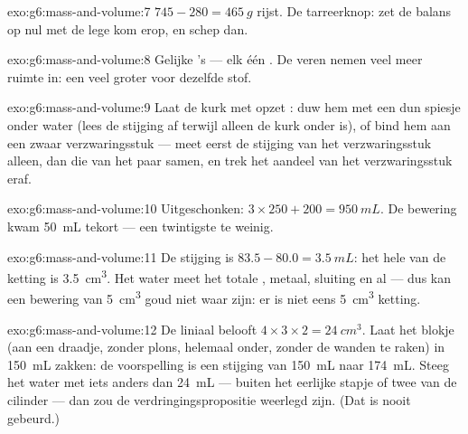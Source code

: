 \begin{solution}{exo:g6:mass-and-volume:7}
$745 - 280 = \qty{465}{g}$ rijst. De tarreerknop: zet de balans op nul
met de lege kom erop, en schep dan.
\end{solution}

\begin{solution}{exo:g6:mass-and-volume:8}
Gelijke 's --- elk één . De veren nemen veel meer ruimte
in: een veel groter  voor dezelfde stof.
\end{solution}

\begin{solution}{exo:g6:mass-and-volume:9}
Laat de kurk met opzet : duw hem met een dun spiesje onder
water (lees de stijging af terwijl alleen de kurk onder is), of bind
hem aan een zwaar verzwaringsstuk --- meet eerst de stijging van het
verzwaringsstuk alleen, dan die van het paar samen, en trek het
aandeel van het verzwaringsstuk eraf.
\end{solution}

\begin{solution}{exo:g6:mass-and-volume:10}
Uitgeschonken: $3 \times 250 + 200 = \qty{950}{mL}$. De bewering kwam
\qty{50}{mL} tekort --- een twintigste  te weinig.
\end{solution}

\begin{solution}{exo:g6:mass-and-volume:11}
De stijging is $83.5 - 80.0 = \qty{3.5}{mL}$: het hele
 van de ketting is \qty{3.5}{cm^3}. Het water meet het totale
, metaal, sluiting en al --- dus kan een bewering van
\qty{5}{cm^3} goud niet waar zijn: er is niet eens \qty{5}{cm^3}
ketting.
\end{solution}

\begin{solution}{exo:g6:mass-and-volume:12}
De liniaal belooft $4 \times 3 \times 2 = \qty{24}{cm^3}$. Laat het
blokje (aan een draadje, zonder plons, helemaal onder, zonder de
wanden te raken) in \qty{150}{mL} zakken: de voorspelling is een
stijging van \qty{150}{mL} naar \qty{174}{mL}. Steeg het water met
iets anders dan \qty{24}{mL} --- buiten het eerlijke stapje of twee
van de cilinder --- dan zou de verdringingspropositie weerlegd zijn.
(Dat is nooit gebeurd.)
\end{solution}

